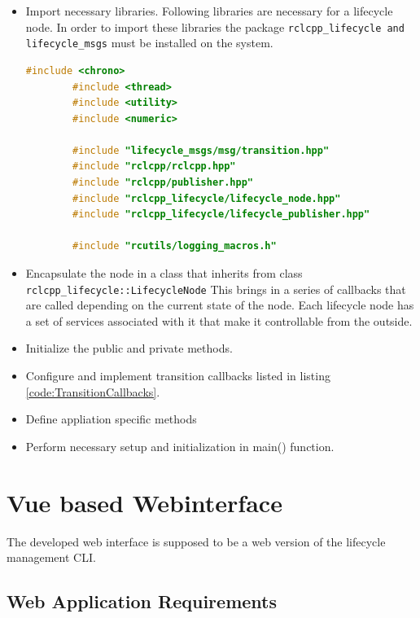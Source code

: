 \begin{itemize}
	\item Import necessary libraries. Following libraries are necessary for a lifecycle node. In order to import these libraries the package \lstinline{rclcpp_lifecycle and lifecycle_msgs} must be installed on the system. \begin{lstlisting}[language=cpp]
		#include <chrono>
		#include <thread>
		#include <utility>
		#include <numeric>

		#include "lifecycle_msgs/msg/transition.hpp"
		#include "rclcpp/rclcpp.hpp"
		#include "rclcpp/publisher.hpp"
		#include "rclcpp_lifecycle/lifecycle_node.hpp"
		#include "rclcpp_lifecycle/lifecycle_publisher.hpp"

		#include "rcutils/logging_macros.h"

	\end{lstlisting}
	\item Encapsulate the node in a class that inherits from class \lstinline{rclcpp_lifecycle::LifecycleNode} This brings in a series of callbacks that are called depending on the current state of the node. Each lifecycle node has a set of services associated with it that make it controllable from the outside.
	\item Initialize the public and private methods.
	\item Configure and implement transition callbacks listed in listing \ref{code:TransitionCallbacks}.
	\item Define appliation specific methods
	\item Perform necessary setup and initialization in main() function.  
\end{itemize}

\section{Vue based Webinterface}
\label{Implementierung:VueBasedWebinterface}
The developed web interface is supposed to be a web version of the lifecycle management CLI. 

\subsection{Web Application Requirements}

